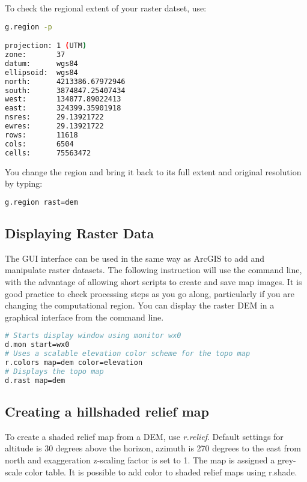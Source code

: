 \noindent To check the regional extent of your raster datset, use:

\begin{lstlisting}[language=bash]
g.region -p

projection: 1 (UTM)
zone:       37
datum:      wgs84
ellipsoid:  wgs84
north:      4213386.67972946
south:      3874847.25407434
west:       134877.89022413
east:       324399.35901918
nsres:      29.13921722
ewres:      29.13921722
rows:       11618
cols:       6504
cells:      75563472

\end{lstlisting}

\noindent You change the region and bring it back to its full extent and original resolution by typing:

\begin{lstlisting}[language=bash]
g.region rast=dem
\end{lstlisting}

\subsection*{Displaying Raster Data}

The GUI interface can be used in the same way as ArcGIS to add and manipulate raster datasets. The following instruction will use the command line, with the advantage of allowing short scripts to create and save map images. It is good practice to check processing steps as you go along, particularly if you are changing the computational region. You can display the raster DEM in a graphical interface from the command line.

\begin{lstlisting}[language=bash]
# Starts display window using monitor wx0
d.mon start=wx0
# Uses a scalable elevation color scheme for the topo map			
r.colors map=dem color=elevation
# Displays the topo map 	
d.rast map=dem
\end{lstlisting}

\subsection*{Creating a hillshaded relief map}

To create a shaded relief map from a DEM, use \emph{r.relief}. Default settings for altitude is 30 degrees above the horizon, azimuth is 270 degrees to the east from north and exaggeration z-scaling factor is set to 1. The map is assigned a grey-scale color table. It is possible to add color to shaded relief maps using r.shade.

